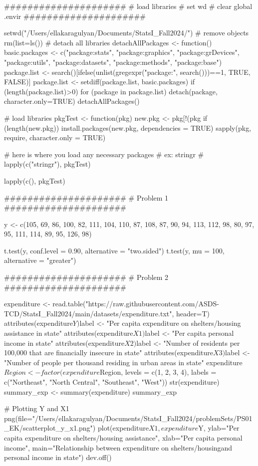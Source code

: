 #####################
# load libraries
# set wd
# clear global .envir
#####################

setwd("/Users/ellakaragulyan/Documents/StatsI_Fall2024/")
# remove objects
rm(list=ls())
# detach all libraries
detachAllPackages <- function() {
  basic.packages <- c("package:stats", "package:graphics", "package:grDevices", "package:utils", "package:datasets", "package:methods", "package:base")
  package.list <- search()[ifelse(unlist(gregexpr("package:", search()))==1, TRUE, FALSE)]
  package.list <- setdiff(package.list, basic.packages)
  if (length(package.list)>0)  for (package in package.list) detach(package,  character.only=TRUE)
}
detachAllPackages()

# load libraries
pkgTest <- function(pkg){
  new.pkg <- pkg[!(pkg %
  if (length(new.pkg)) 
    install.packages(new.pkg,  dependencies = TRUE)
  sapply(pkg,  require,  character.only = TRUE)
}

# here is where you load any necessary packages
# ex: stringr
# lapply(c("stringr"),  pkgTest)

lapply(c(),  pkgTest)

#####################
# Problem 1
#####################

y <- c(105, 69, 86, 100, 82, 111, 104, 110, 87, 108, 87, 90, 94, 113, 112, 98, 80, 97, 95, 111, 114, 89, 95, 126, 98)

t.test(y, conf.level = 0.90, alternative = "two.sided")
t.test(y, mu = 100, alternative = "greater")


#####################
# Problem 2
#####################

expenditure <- read.table("https://raw.githubusercontent.com/ASDS-TCD/StatsI_Fall2024/main/datasets/expenditure.txt", header=T)
	attributes(expenditure$Y)$label <- "Per capita expenditure on shelters/housing assistance in state"
	attributes(expenditure$X1)$label <- "Per capita personal income in state"
	attributes(expenditure$X2)$label <- "Number of residents per 100,000 that are financially insecure in state"
	attributes(expenditure$X3)$label <- "Number of people per thousand residing in urban areas in state"
	expenditure$Region <- factor(expenditure$Region, 
            levels = c(1, 2, 3, 4), 
            labels = c("Northeast", "North Central", "Southeast", "West"))
str(expenditure)
summary_exp <- summary(expenditure)
summary_exp


# Plotting Y and X1
png(file="/Users/ellakaragulyan/Documents/StatsI_Fall2024/problemSets/PS01_EK/scatterplot_y_x1.png")
plot(expenditure$X1, expenditure$Y,
     ylab="Per capita expenditure on shelters/housing assistance",
     xlab="Per capita personal income",
     main="Relationship between expenditure on shelters/housing\nassistance and personal income in state")
dev.off()

